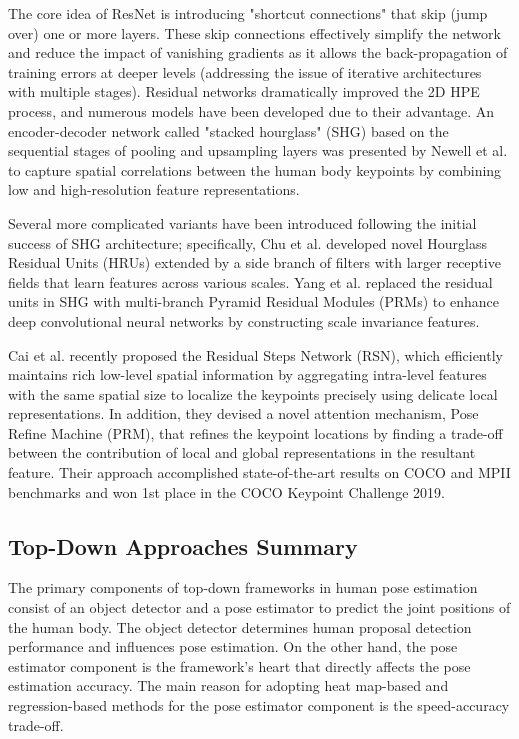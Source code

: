 The core idea of ResNet is introducing "shortcut connections" that skip (jump over) one or more layers. These skip connections effectively simplify the network and reduce the impact of vanishing gradients as it allows the back-propagation of training errors at deeper levels (addressing the issue of iterative architectures with multiple stages). Residual networks dramatically improved the 2D HPE process, and numerous models
\cite{cai_learning_2020, chen_cascaded_2018, chu_multi-context_2017, ke_multi-scale_2018, liu_cascaded_2018, newell_stacked_2016, su_multi-person_2019, sun_deep_2019, xiao_simple_2018-1, yang_learning_2017} have been developed due to their advantage. An encoder-decoder network called "stacked hourglass" (SHG) based on the sequential stages of pooling and upsampling layers was presented by Newell et al. \cite{newell_stacked_2016} to capture spatial correlations between the human body keypoints by combining low and high-resolution feature representations. 

Several more complicated variants have been introduced following the initial success of SHG architecture; specifically, Chu et al. \cite{chu_multi-context_2017} developed novel Hourglass Residual Units (HRUs) extended by a side branch of filters with larger receptive fields that learn features across various scales. Yang et al. \cite{yang_learning_2017} replaced the residual units in SHG with multi-branch Pyramid Residual Modules (PRMs) to enhance deep convolutional neural networks by constructing scale invariance features. 

Cai et al. \cite{cai_learning_2020} recently proposed the Residual Steps Network (RSN), which efficiently maintains rich low-level spatial information by aggregating intra-level features with the same spatial size to localize the keypoints precisely using delicate local representations. In addition, they devised a novel attention mechanism, Pose Refine Machine (PRM), that refines the keypoint locations by finding a trade-off between the contribution of local and global representations in the resultant feature. Their approach accomplished state-of-the-art results on COCO and MPII benchmarks and won 1st place in the COCO Keypoint Challenge 2019.


\subsection*{Top-Down Approaches Summary}

The primary components of top-down frameworks in human pose estimation consist of an object detector and a pose estimator to predict the joint positions of the human body. The object detector determines human proposal detection performance and influences pose estimation. On the other hand, the pose estimator component is the framework's heart that directly affects the pose estimation accuracy. The main reason for adopting heat map-based and regression-based methods for the pose estimator component is the speed-accuracy trade-off. 


